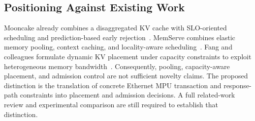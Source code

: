 \subsection{Positioning Against Existing Work}
Mooncake already combines a disaggregated KV cache with SLO-oriented
scheduling and prediction-based early rejection~\cite{mooncake}.
MemServe combines elastic memory pooling, context caching, and
locality-aware scheduling~\cite{memserve}. Fang and colleagues formulate
dynamic KV placement under capacity constraints to exploit heterogeneous
memory bandwidth~\cite{dynamicplacement}. Consequently, pooling,
capacity-aware placement, and admission control are not sufficient
novelty claims. The proposed distinction is the translation of concrete
Ethernet MPU transaction and response-path constraints into placement
and admission decisions. A full related-work review and experimental
comparison are still required to establish that distinction.
